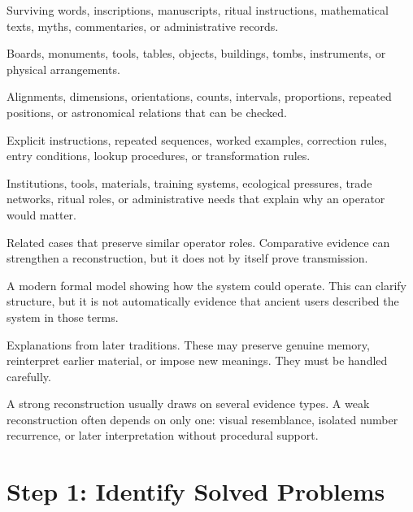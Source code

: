 \documentclass[11pt]{book}
\begin{document}
\begin{description}[leftmargin=3.2cm, style=nextline]
    \item[Textual evidence]
    Surviving words, inscriptions, manuscripts, ritual instructions, mathematical texts, myths, commentaries, or administrative records.

    \item[Material evidence]
    Boards, monuments, tools, tables, objects, buildings, tombs, instruments, or physical arrangements.

    \item[Measured evidence]
    Alignments, dimensions, orientations, counts, intervals, proportions, repeated positions, or astronomical relations that can be checked.

    \item[Procedural evidence]
    Explicit instructions, repeated sequences, worked examples, correction rules, entry conditions, lookup procedures, or transformation rules.

    \item[Contextual evidence]
    Institutions, tools, materials, training systems, ecological pressures, trade networks, ritual roles, or administrative needs that explain why an operator would matter.

    \item[Comparative evidence]
    Related cases that preserve similar operator roles. Comparative evidence can strengthen a reconstruction, but it does not by itself prove transmission.

    \item[Mathematical reconstruction]
    A modern formal model showing how the system could operate. This can clarify structure, but it is not automatically evidence that ancient users described the system in those terms.

    \item[Later commentary]
    Explanations from later traditions. These may preserve genuine memory, reinterpret earlier material, or impose new meanings. They must be handled carefully.
\end{description}

A strong reconstruction usually draws on several evidence types. A weak reconstruction often depends on only one: visual resemblance, isolated number recurrence, or later interpretation without procedural support.

\section{Step 1: Identify Solved Problems}
\end{document}
